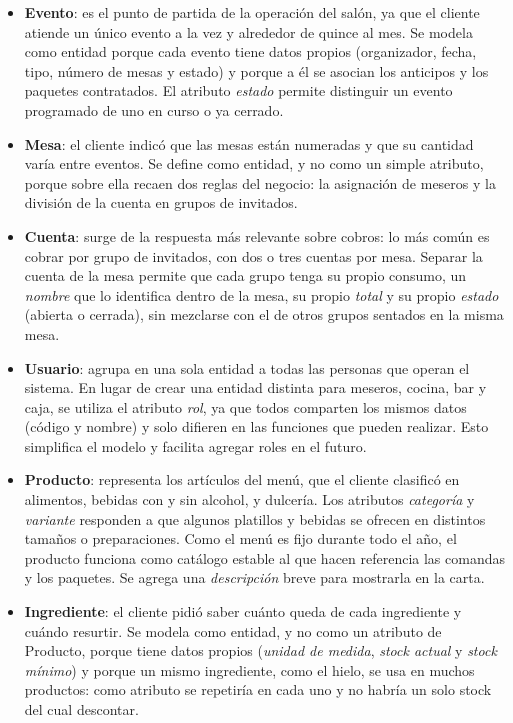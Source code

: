 \begin{itemize}
    \item \textbf{Evento}: es el punto de partida de la operación del salón, ya que el cliente atiende un único evento a la vez y alrededor de quince al mes. Se modela como entidad porque cada evento tiene datos propios (organizador, fecha, tipo, número de mesas y estado) y porque a él se asocian los anticipos y los paquetes contratados. El atributo \emph{estado} permite distinguir un evento programado de uno en curso o ya cerrado.

    \item \textbf{Mesa}: el cliente indicó que las mesas están numeradas y que su cantidad varía entre eventos. Se define como entidad, y no como un simple atributo, porque sobre ella recaen dos reglas del negocio: la asignación de meseros y la división de la cuenta en grupos de invitados.

    \item \textbf{Cuenta}: surge de la respuesta más relevante sobre cobros: lo más común es cobrar por grupo de invitados, con dos o tres cuentas por mesa. Separar la cuenta de la mesa permite que cada grupo tenga su propio consumo, un \emph{nombre} que lo identifica dentro de la mesa, su propio \emph{total} y su propio \emph{estado} (abierta o cerrada), sin mezclarse con el de otros grupos sentados en la misma mesa.

    \item \textbf{Usuario}: agrupa en una sola entidad a todas las personas que operan el sistema. En lugar de crear una entidad distinta para meseros, cocina, bar y caja, se utiliza el atributo \emph{rol}, ya que todos comparten los mismos datos (código y nombre) y solo difieren en las funciones que pueden realizar. Esto simplifica el modelo y facilita agregar roles en el futuro.

    \item \textbf{Producto}: representa los artículos del menú, que el cliente clasificó en alimentos, bebidas con y sin alcohol, y dulcería. Los atributos \emph{categoría} y \emph{variante} responden a que algunos platillos y bebidas se ofrecen en distintos tamaños o preparaciones. Como el menú es fijo durante todo el año, el producto funciona como catálogo estable al que hacen referencia las comandas y los paquetes. Se agrega una \emph{descripción} breve para mostrarla en la carta.

    \item \textbf{Ingrediente}: el cliente pidió saber cuánto queda de cada ingrediente y cuándo resurtir. Se modela como entidad, y no como un atributo de Producto, porque tiene datos propios (\emph{unidad de medida}, \emph{stock actual} y \emph{stock mínimo}) y porque un mismo ingrediente, como el hielo, se usa en muchos productos: como atributo se repetiría en cada uno y no habría un solo stock del cual descontar.


\end{itemize}
